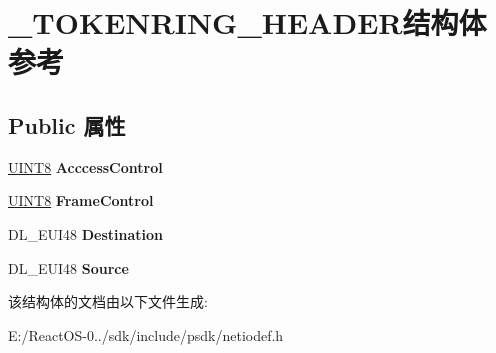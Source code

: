 \hypertarget{struct___t_o_k_e_n_r_i_n_g___h_e_a_d_e_r}{}\section{\+\_\+\+T\+O\+K\+E\+N\+R\+I\+N\+G\+\_\+\+H\+E\+A\+D\+E\+R结构体 参考}
\label{struct___t_o_k_e_n_r_i_n_g___h_e_a_d_e_r}
\subsection*{Public 属性}
\begin{DoxyCompactItemize}
\item 
\mbox{\label{struct___t_o_k_e_n_r_i_n_g___h_e_a_d_e_r_a120f3f7750e4ceb94b9cd1f2b13cccd8}} 
\hyperlink{_processor_bind_8h_ab27e9918b538ce9d8ca692479b375b6a}{U\+I\+N\+T8} {\bfseries Acccess\+Control}
\item 
\mbox{\label{struct___t_o_k_e_n_r_i_n_g___h_e_a_d_e_r_a5a57c9ce5a05f1f1301a1f1ecacb9527}} 
\hyperlink{_processor_bind_8h_ab27e9918b538ce9d8ca692479b375b6a}{U\+I\+N\+T8} {\bfseries Frame\+Control}
\item 
\mbox{\label{struct___t_o_k_e_n_r_i_n_g___h_e_a_d_e_r_a5bf52fee2c14e2df4294d58a8b7c7872}} 
D\+L\+\_\+\+E\+U\+I48 {\bfseries Destination}
\item 
\mbox{\label{struct___t_o_k_e_n_r_i_n_g___h_e_a_d_e_r_a9be9d17b7a30d3fb5eb659382b2c407e}} 
D\+L\+\_\+\+E\+U\+I48 {\bfseries Source}
\end{DoxyCompactItemize}


该结构体的文档由以下文件生成\+:\begin{DoxyCompactItemize}
\item 
E\+:/\+React\+O\+S-\/0../sdk/include/psdk/netiodef.\+h\end{DoxyCompactItemize}
